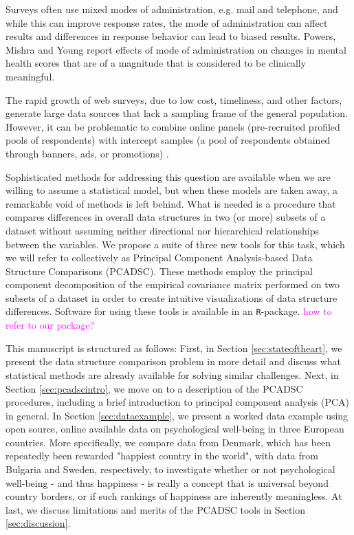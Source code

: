 \documentclass[titlepage,11pt,twoside]{article}
\newcommand{\hl}[1]{\textcolor{magenta}{#1}}
\begin{document}
Surveys often use mixed modes of administration, e.g. mail and telephone, and while this can improve response rates, the mode of administration can affect results \cite{Brambilla1987,McHorney1994} and differences in response behavior can lead to biased results. Powers, Mishra and Young \citeyearpar{Powers2005} report effects of mode of administration on changes in mental health scores that are of a magnitude that is considered to be clinically meaningful.

The rapid growth of web surveys, due to low cost, timeliness, and other factors, generate large data sources that lack a sampling frame of the general population. However, it can be problematic to combine online panels (pre-recruited profiled pools of respondents) with intercept samples (a pool of respondents obtained through banners, ads, or promotions) \cite{Liu2016}.

Sophisticated methods for addressing this question are available when we are willing to assume a statistical model, but when these models are taken away, a remarkable void of methods is left behind. What is needed is a procedure that compares differences in overall data structures in two (or more) subsets of a dataset without assuming neither directional nor hierarchical relationships between the variables. We propose a suite of three new tools for this task, which we will refer to collectively as Principal Component Analysis-based Data Structure Comparisons (PCADSC). These methods employ the principal component decomposition of the empirical covariance matrix performed on two subsets of a dataset in order to create intuitive visualizations of data structure differences. Software for using these tools is available in an \texttt{R}-package. \hl{how to refer to our package?}


This manuscript is structured as follows: First, in Section \ref{sec:stateoftheart}, we present the data structure comparison problem in more detail and discuss what statistical methods are already available for solving similar challenges. Next, in Section \ref{sec:pcadscintro}, we move on to a description of the PCADSC procedures, including a brief introduction to principal component analysis (PCA) in general. In Section \ref{sec:dataexample}, we present a worked data example using open source, online available data on psychological well-being in three European countries. More specifically, we compare data from Denmark, which has been repeatedly been rewarded "happiest country in the world", with data from Bulgaria and Sweden, respectively, to investigate whether or not psychological well-being - and thus happiness - is really a concept that is universal beyond country borders, or if such rankings of happiness are inherently meaningless. At last, we discuss limitations and merits of the PCADSC tools in Section \ref{sec:discussion}. 
\end{document}
